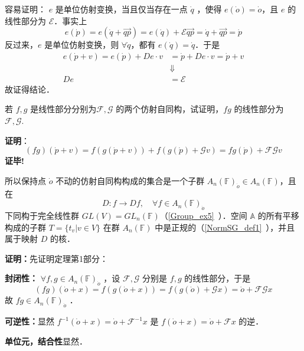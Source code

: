 容易证明： $e$ 是单位仿射变换，当且仅当存在一点 $\dot q$ ，使得 $e(\dot o)=\dot o$，且 $e$ 的线性部分为 $\mathcal E$．事实上
 \begin{equation}
  e(\dot p)=e(\dot q+\overrightarrow{qp})=e(\dot q)+\mathcal E \overrightarrow{qp}=\dot q+\overrightarrow{qp}=\dot p
 \end{equation}
反过来，$e$ 是单位仿射变换，则 $\forall\dot q$，都有 $e(\dot q)=\dot q$．于是
\begin{equation}
\begin{aligned}
e(\dot p+v)=e(\dot p)+De\cdot v&=\dot p+De\cdot v=\dot p+v\\
&\Downarrow\\
De&=\mathcal E
\end{aligned}
\end{equation}
故证得结论．
\begin{example}{}
若 $f,g$ 是线性部分分别为$\mathcal F,\mathcal G$ 的两个仿射自同构，试证明，$fg$ 的线性部分为 $\mathcal {F,G}$.

\textbf{证明}：\begin{equation}
(fg)(\dot p+v)=f(g(\dot p+v))+f(g(\dot p)+\mathcal G v)=fg(\dot p)+\mathcal {FG}v
\end{equation}
\textbf{证毕!}
\end{example}
\begin{theorem}{}
所以保持点 $\dot o$ 不动的仿射自同构构成的集合是一个子群 $A_n(\mathbb F)_{\dot o}\in A_n(\mathbb F)$，且在 
\begin{equation}
D:f\rightarrow Df,\quad \forall f\in A_n(\mathbb F)_{\dot o}
\end{equation}
下同构于完全线性群 $GL(V)=GL_n(\mathbb F)$（\autoref{Group_ex5}~）．空间 $\mathbb A$ 的所有平移构成的子群 $T=\{t_v|v\in V\}$ 在群 $A_n(\mathbb F)$ 中是正规的（\autoref{NormSG_def1}~），并且属于映射 $D$ 的核．
\end{theorem}
\textbf{证明：}先证明定理第1部分：

\textbf{封闭性：} $\forall f,g\in A_n(\mathbb F)_{\dot o}$ ，设 $\mathcal F,\mathcal G$ 分别是 $f,g$ 的线性部分，于是 
\begin{equation}
(fg)(\dot o+x)=f(g(\dot o+x))=f(g(\dot o)+\mathcal G x)=\dot o+\mathcal{FG}x
\end{equation}
故 $fg\in A_n(\mathbb F)_{\dot o}$ ．

\textbf{可逆性：}显然 $f^{-1}(\dot o+x)=\dot o+\mathcal F^{-1}x$ 是 $f(\dot o+x)=\dot o+\mathcal F x$ 的逆．

\textbf{单位元，结合性}显然．

